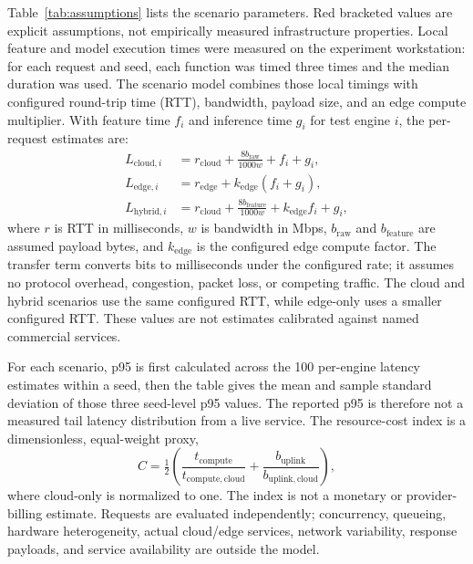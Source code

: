 ﻿\documentclass[conference]{IEEEtran}
\begin{document}
Table~\ref{tab:assumptions} lists the scenario parameters. Red bracketed values are explicit assumptions, not empirically measured infrastructure properties. Local feature and model execution times were measured on the experiment workstation: for each request and seed, each function was timed three times and the median duration was used. The scenario model combines those local timings with configured round-trip time (RTT), bandwidth, payload size, and an edge compute multiplier. With feature time $f_i$ and inference time $g_i$ for test engine $i$, the per-request estimates are:
\begin{align}
 L_{\mathrm{cloud},i} &= r_{\mathrm{cloud}}+
 \frac{8b_{\mathrm{raw}}}{1000w}+f_i+g_i,\\
 L_{\mathrm{edge},i} &= r_{\mathrm{edge}}+
 k_{\mathrm{edge}}(f_i+g_i),\\
 L_{\mathrm{hybrid},i} &= r_{\mathrm{cloud}}+
 \frac{8b_{\mathrm{feature}}}{1000w}
 +k_{\mathrm{edge}}f_i+g_i,
\end{align}
where $r$ is RTT in milliseconds, $w$ is bandwidth in Mbps, $b_{\mathrm{raw}}$ and $b_{\mathrm{feature}}$ are assumed payload bytes, and $k_{\mathrm{edge}}$ is the configured edge compute factor. The transfer term converts bits to milliseconds under the configured rate; it assumes no protocol overhead, congestion, packet loss, or competing traffic. The cloud and hybrid scenarios use the same configured RTT, while edge-only uses a smaller configured RTT. These values are not estimates calibrated against named commercial services.

For each scenario, p95 is first calculated across the 100 per-engine latency estimates within a seed, then the table gives the mean and sample standard deviation of those three seed-level p95 values. The reported p95 is therefore not a measured tail latency distribution from a live service. The resource-cost index is a dimensionless, equal-weight proxy,
\begin{equation}
 C=\tfrac{1}{2}\left(\frac{t_{\mathrm{compute}}}{t_{\mathrm{compute,cloud}}}+\frac{b_{\mathrm{uplink}}}{b_{\mathrm{uplink,cloud}}}\right),
\end{equation}
where cloud-only is normalized to one. The index is not a monetary or provider-billing estimate. Requests are evaluated independently; concurrency, queueing, hardware heterogeneity, actual cloud/edge services, network variability, response payloads, and service availability are outside the model.
\end{document}
